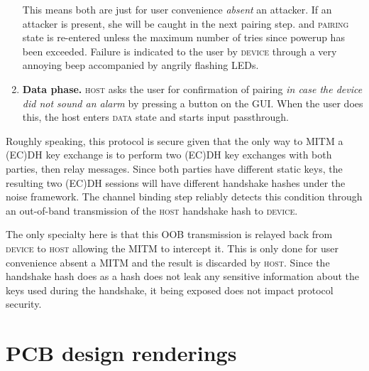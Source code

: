 \documentclass[12pt,a4paper,notitlepage]{article}
\begin{document}
\begin{enumerate}
{        This means both are just for user convenience \emph{absent} an attacker. If an attacker is present, she will be
        caught in the next pairing step.
    } and \textsc{pairing} state is re-entered unless the maximum number of tries since powerup has been exceeded.
    Failure is indicated to the user by \textsc{device} through a very annoying beep accompanied by angrily flashing
    LEDs.
\item \textbf{Data phase.} \textsc{host} asks the user for confirmation of pairing \emph{in case the device did not sound an alarm} by
    pressing a button on the GUI. When the user does this, the host enters \textsc{data} state and starts input
    passthrough.
\end{enumerate}

Roughly speaking, this protocol is secure given that the only way to MITM a (EC)DH key exchange is to perform two (EC)DH key exchanges with both parties, then relay messages. Since both parties have different static keys, the resulting two (EC)DH sessions will have different handshake hashes under the noise framework. The channel binding step reliably detects this condition through an out-of-band transmission of the \textsc{host} handshake hash to \textsc{device}.

The only specialty here is that this OOB transmission is relayed back from \textsc{device} to \textsc{host} allowing the MITM to intercept it. This is only done for user convenience absent a MITM and the result is discarded by \textsc{host}. Since the handshake hash does as a hash does not leak any sensitive information about the keys used during the handshake, it being exposed does not impact protocol security.

\section{PCB design renderings}
\label{ch:renderings}
\end{document}
